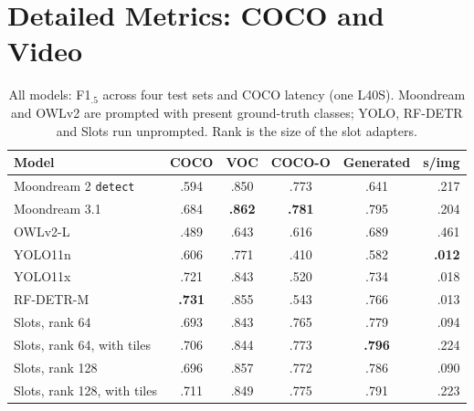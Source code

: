 \documentclass[10pt,twocolumn]{article}
\begin{document}
\section{Detailed Metrics: COCO and Video}

\begin{table}[h]
\centering\small\setlength{\tabcolsep}{8pt}
\caption{All models: F1$_{.5}$ across four test sets and COCO latency (one L40S).
Moondream and OWLv2 are prompted with present ground-truth classes; YOLO, RF-DETR and
Slots run unprompted. Rank is the size of the slot adapters.}
\label{tab:baselines}
\begin{tabular}{@{}lccccr@{}}
\toprule
Model & COCO & VOC & COCO-O & Generated & s/img \\
\midrule
Moondream 2 \texttt{detect} & .594 & .850 & .773 & .641 & .217 \\
Moondream 3.1 & .684 & \textbf{.862} & \textbf{.781} & .795 & .204 \\
OWLv2-L & .489 & .643 & .616 & .689 & .461 \\
YOLO11n & .606 & .771 & .410 & .582 & \textbf{.012} \\
YOLO11x & .721 & .843 & .520 & .734 & .018 \\
RF-DETR-M & \textbf{.731} & .855 & .543 & .766 & .013 \\
\midrule
\rowcolor{rowtint} Slots, rank 64 & .693 & .843 & .765 & .779 & .094 \\
\rowcolor{rowtint} Slots, rank 64, with tiles & .706 & .844 & .773 & \textbf{.796} & .224 \\
\rowcolor{rowtint} Slots, rank 128 & .696 & .857 & .772 & .786 & .090 \\
\rowcolor{rowtint} Slots, rank 128, with tiles & .711 & .849 & .775 & .791 & .223 \\
\bottomrule
\end{tabular}
\end{table}
\end{document}

